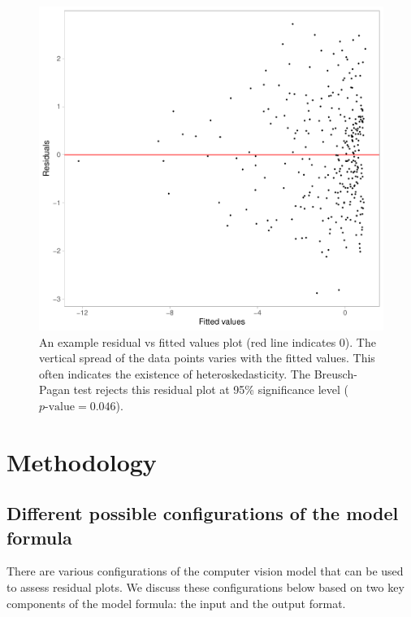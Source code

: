 \documentclass[]{interact}
\theoremstyle{plain}%
\theoremstyle{definition}
\theoremstyle{remark}
\begin{document}
\begin{figure}[!h]

{\centering \includegraphics[width=1\linewidth]{paper_files/figure-latex/false-finding-1} 

}

\caption{An example residual vs fitted values plot (red line indicates 0). The vertical spread of the data points varies with the fitted values. This often indicates the existence of heteroskedasticity. The Breusch-Pagan test rejects this residual plot at 95\% significance level ($p\text{-value} = 0.046$).}\label{fig:false-finding}
\end{figure}

\hypertarget{methodology}{%
\section{Methodology}\label{methodology}}

\hypertarget{different-possible-configurations-of-the-model-formula}{%
\subsection{Different possible configurations of the model
formula}\label{different-possible-configurations-of-the-model-formula}}

There are various configurations of the computer vision model that can
be used to assess residual plots. We discuss these configurations below
based on two key components of the model formula: the input and the
output format.
\end{document}
